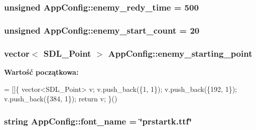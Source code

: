 \subsubsection[{enemy\+\_\+redy\+\_\+time}]{\setlength{\rightskip}{0pt plus 5cm}unsigned App\+Config\+::enemy\+\_\+redy\+\_\+time = 500\hspace{0.3cm}{\ttfamily [static]}}\label{class_app_config_a64c3cd6cd3e16b336f6577e4618fafa6}
\hypertarget{class_app_config_a70c6740393da27baf8d67137eafc0817}{}
\subsubsection[{enemy\+\_\+start\+\_\+count}]{\setlength{\rightskip}{0pt plus 5cm}unsigned App\+Config\+::enemy\+\_\+start\+\_\+count = 20\hspace{0.3cm}{\ttfamily [static]}}\label{class_app_config_a70c6740393da27baf8d67137eafc0817}
\hypertarget{class_app_config_a3ff8c966e47fe083d3c05efe171f35f7}{}
\subsubsection[{enemy\+\_\+starting\+\_\+point}]{\setlength{\rightskip}{0pt plus 5cm}vector$<$ S\+D\+L\+\_\+\+Point $>$ App\+Config\+::enemy\+\_\+starting\+\_\+point\hspace{0.3cm}{\ttfamily [static]}}\label{class_app_config_a3ff8c966e47fe083d3c05efe171f35f7}
{\bfseries Wartość początkowa\+:}
\begin{DoxyCode}
=
[]\{
    vector<SDL\_Point> v;
    v.push\_back(\{1, 1\});
    v.push\_back(\{192, 1\});
    v.push\_back(\{384, 1\});
    \textcolor{keywordflow}{return} v;
\}()
\end{DoxyCode}
\hypertarget{class_app_config_a8791b4aad5b035b27ce6bbc8c519b586}{}
\subsubsection[{font\+\_\+name}]{\setlength{\rightskip}{0pt plus 5cm}string App\+Config\+::font\+\_\+name = \char`\"{}prstartk.\+ttf\char`\"{}\hspace{0.3cm}{\ttfamily [static]}}\label{class_app_config_a8791b4aad5b035b27ce6bbc8c519b586}
\hypertarget{class_app_config_af1955c96963f2fc779004fcc7298c92c}{}
